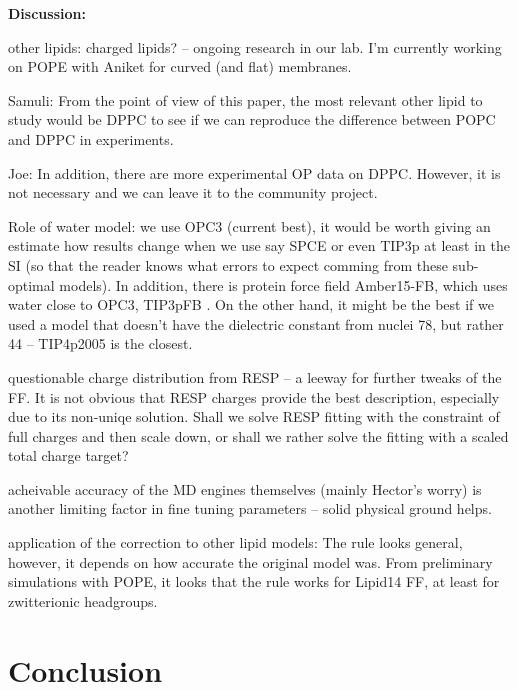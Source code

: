 \documentclass[aip,jcp,twocolumn]{revtex4}
\begin{document}
\textbf{Discussion:}


other lipids: charged lipids? -- ongoing research in our lab.
I'm currently working on POPE with Aniket for curved (and flat) membranes. 

Samuli: From the point of view of this paper, the most relevant other lipid to study would be DPPC to see if we can reproduce the difference between POPC and DPPC in experiments.

Joe: In addition, there are more experimental OP data on DPPC. However, it is not necessary and we can leave it to the community project. 

Role of water model: we use OPC3 (current best), it would be worth giving an estimate how results change when we use say SPCE or even TIP3p at least in the SI (so that the reader knows what errors to expect comming from these sub-optimal models). 
In addition, there is protein force field Amber15-FB, which uses water close to OPC3, TIP3pFB .
On the other hand, it might be the best if we used a model that doesn't have the dielectric constant from nuclei 78, but rather 44 -- TIP4p2005 is the closest. \cite{OPC_paper, ForceBalance_paper}

questionable charge distribution from RESP -- a leeway for further tweaks of the FF.
It is not obvious that RESP charges provide the best description, especially due to its non-uniqe solution. 
Shall we solve RESP fitting with the constraint of full charges and then scale down, or shall we rather solve the fitting with a scaled total charge target?

acheivable accuracy of the MD engines themselves (mainly Hector's worry) is another limiting factor in fine tuning parameters -- solid physical ground helps.

application of the correction to other lipid models: The rule looks general, however, it depends on how accurate the original model was.
From preliminary simulations with POPE, it looks that the rule works for Lipid14 FF, at least for zwitterionic headgroups.

\section{Conclusion}
\end{document}
